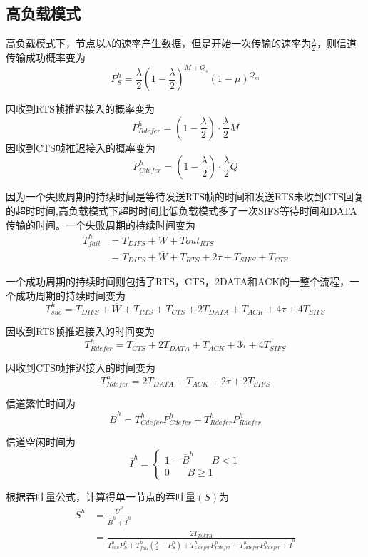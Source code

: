 \subsection {高负载模式}
高负载模式下，节点以$\lambda$的速率产生数据，但是开始一次传输的速率为$\frac{\lambda}{2}$，则信道传输成功概率变为
\begin{equation}
P_S^h=\frac{\lambda}{2}(1-\frac{\lambda}{2})^{M+Q_s}(1-\mu)^{Q_m}
\end{equation}

因收到RTS帧推迟接入的概率变为
\begin{equation}
P_{Rdefer}^h=(1-\frac{\lambda}{2})\cdot\frac{\lambda}{2} M
\end{equation}
因收到CTS帧推迟接入的概率变为
\begin{equation}
P_{Cdefer}^h=(1-\frac{\lambda}{2})\cdot\frac{\lambda}{2} Q
\end{equation}

因为一个失败周期的持续时间是等待发送RTS帧的时间和发送RTS未收到CTS回复的超时时间,高负载模式下超时时间比低负载模式多了一次SIFS等待时间和DATA传输的时间。一个失败周期的持续时间变为
\begin{equation}
\begin{aligned}
T_{fail}^h&=T_{DIFS}+\overline W+Tout_{RTS}\\
&=T_{DIFS}+\overline W+T_{RTS}+2\tau+T_{SIFS}+T_{CTS}
\end{aligned}
\end{equation}

一个成功周期的持续时间则包括了RTS，CTS，2DATA和ACK的一整个流程，一个成功周期的持续时间变为
\begin{equation}
T_{suc}^h=T_{DIFS}+\overline W+T_{RTS}+T_{CTS}+2T_{DATA}+T_{ACK}+4\tau+4T_{SIFS}
\end{equation}

因收到RTS帧推迟接入的时间变为
\begin{equation}
T_{Rdefer}^h=T_{CTS}+2T_{DATA}+T_{ACK}+3\tau+4T_{SIFS}
\end{equation}

因收到CTS帧推迟接入的时间变为
\begin{equation}
T_{Rdefer}^h=2T_{DATA}+T_{ACK}+2\tau+2T_{SIFS}
\end{equation}

信道繁忙时间为
\begin{equation}
\overline B^h=T_{Cdefer}^hP_{Cdefer}^h+T_{Rdefer}^hP_{Rdefer}^h
\end{equation}

信道空闲时间为
\begin{equation}
\overline I^h=\left\{
\begin{aligned}
1-\overline B^h \ \ \ \ \ \ \ \ B<1\\
0\ \ \ \ \ \ \ \    B\ge 1
\end{aligned}
\right.
\end{equation}

根据吞吐量公式，计算得单一节点的吞吐量$(S)$为
\begin{equation}
\begin{aligned}
S^h&=\frac{\overline U^h}{\overline B^h+\overline I^h}\\&=\frac{2T_{DATA}}{ T_{suc}^h P_S^h+T_{fail}^h(\frac{\lambda}{2}-P_S^h )+ T_{Cdefer}^hP_{Cdefer}^h+T_{Rdefer}^hP_{Rdefer}^h+\overline I^h}
\end{aligned}
\end{equation}

\endinput